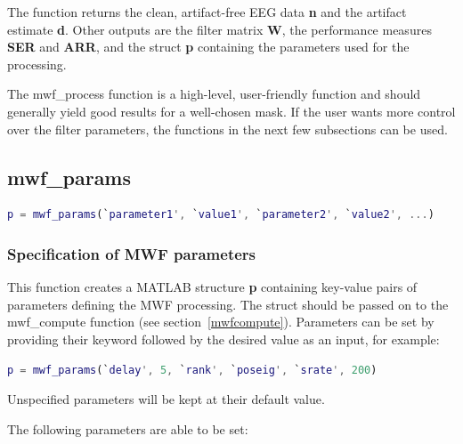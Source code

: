 \documentclass[11pt]{article}
\begin{document}
The function returns the clean, artifact-free EEG data \textbf{n} and the artifact estimate \textbf{d}. Other outputs are the filter matrix \textbf{W}, the performance measures \textbf{SER} and \textbf{ARR}, and the struct \textbf{p} containing the parameters used for the processing.

The mwf\_process function is a high-level, user-friendly function and should generally yield good results for a well-chosen mask. If the user wants more control over the filter parameters, the functions in the next few subsections can be used.

\newpage
\subsection{mwf\_params}
\label{mwfparams}

\begin{lstlisting}[frame=single, language=matlab]
p = mwf_params(`parameter1', `value1', `parameter2', `value2', ...)
\end{lstlisting}

\subsubsection{Specification of MWF parameters}

This function creates a MATLAB structure \textbf{p} containing key-value pairs of parameters defining the MWF processing. The struct should be passed on to the mwf\_compute function (see section~\ref{mwfcompute}). Parameters can be set by providing their keyword followed by the desired value as an input, for example:
%
\begin{lstlisting}[frame=single, language=matlab]
p = mwf_params(`delay', 5, `rank', `poseig', `srate', 200)
\end{lstlisting}
%
Unspecified parameters will be kept at their default value.

The following parameters are able to be set:
\end{document}
